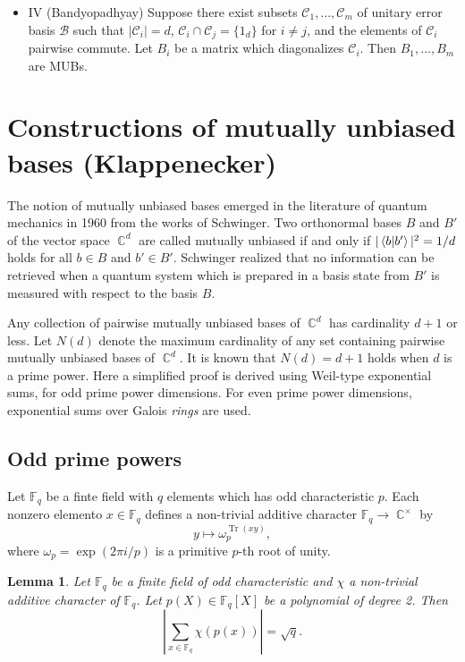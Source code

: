 \documentclass[a4paper]{article}
\DeclareMathOperator{\C}{\mathbb{C}}
\DeclareMathOperator{\Tr}{Tr}
\newtheorem{lemma}{Lemma}
\begin{document}
  \begin{itemize}
    \item IV (Bandyopadhyay) Suppose there exist subsets
      $\mathcal C_1,\ldots,\mathcal C_m$ of unitary error
      basis $\mathcal B$ such that $|\mathcal C_i| = d$,
      $\mathcal C_i \cap \mathcal C_j = \{1_d\}$ for $i \neq
      j$, and the elements of $\mathcal C_i$ pairwise
      commute. Let $B_i$ be a matrix which diagonalizes
      $\mathcal C_i$. Then $B_1,\ldots,B_m$ are MUBs.
  \end{itemize}

  \section{Constructions of mutually unbiased bases
  (Klappenecker)}

  The notion of mutually unbiased bases emerged in the
  literature of quantum mechanics in 1960 from the works of
  Schwinger. Two orthonormal bases $B$ and $B'$ of the
  vector space $\C^{d}$ are called mutually unbiased if and
  only if $|\braket{b|b'}|^2 = 1 / d$ holds for all $b \in
  B$ and $b' \in B'$. Schwinger realized that no information
  can be retrieved when a quantum system which is prepared
  in a basis state from $B'$ is measured with respect to the
  basis $B$.

  Any collection of pairwise mutually unbiased bases of
  $\C^{d}$ has cardinality $d+1$ or less. Let $N(d)$ denote
  the maximum cardinality of any set containing pairwise
  mutually unbiased bases of $\C^{d}$. It is known that
  $N(d) = d + 1$ holds when $d$ is a prime power. Here a
  simplified proof is derived using Weil-type exponential
  sums, for odd prime power dimensions. For even prime power
  dimensions, exponential sums over Galois \textit{rings}
  are used. 

  \subsection{Odd prime powers}

  Let $\mathbb F_q$ be a finte field with $q$ elements which
  has odd characteristic $p$. Each nonzero elemento $x \in
  \mathbb F_q$ defines a non-trivial additive character
  $\mathbb F_q \to \C^{\times}$ by
  \[
    y \mapsto \omega_p^{\Tr(xy)},
  \] 
  where $\omega_p = \exp(2\pi i / p)$ is a primitive $p$-th
  root of unity.

  \begin{lemma}
    Let $\mathbb F_q$ be a finite field of odd
    characteristic and $\chi$ a non-trivial additive
    character of $\mathbb F_q$. Let $p(X) \in \mathbb
    F_q[X]$ be a polynomial of degree 2. Then
    \[
      \left|
      \sum_{x \in \mathbb F_q}^{} \chi(p(x))
      \right|
      = \sqrt{q}.
    \] 
  \end{lemma}
\end{document}
